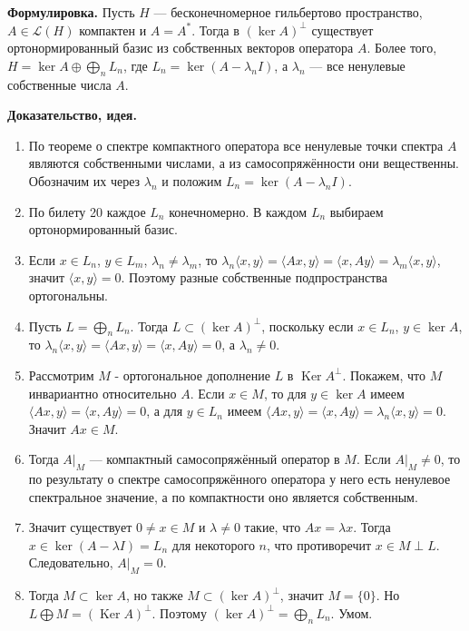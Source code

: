 \documentclass[10pt,a4paper]{article}
\newcommand{\Ker}{\operatorname{Ker}}
\begin{document}
	\textbf{Формулировка.} Пусть $H$ --- бесконечномерное гильбертово пространство, $A\in\mathcal L(H)$ компактен и $A=A^*$. Тогда в $(\ker A)^\perp$ существует ортонормированный базис из собственных векторов оператора $A$. Более того, $H=\ker A\oplus{\bigoplus_n L_n}$, где $L_n=\ker(A-\lambda_n I)$, а $\lambda_n$ --- все ненулевые собственные числа $A$.

	\textbf{Доказательство, идея.}
	\begin{enumerate}
		\item По теореме о спектре компактного оператора все ненулевые точки спектра $A$ являются собственными числами, а из самосопряжённости они вещественны. Обозначим их через $\lambda_n$ и положим $L_n=\ker(A-\lambda_n I)$.

		\item По билету 20 каждое $L_n$ конечномерно. В каждом $L_n$ выбираем ортонормированный базис.

		\item Если $x\in L_n$, $y\in L_m$, $\lambda_n\ne\lambda_m$, то $\lambda_n\langle x,y\rangle=\langle Ax,y\rangle=\langle x,Ay\rangle=\lambda_m\langle x,y\rangle$, значит $\langle x,y\rangle=0$. Поэтому разные собственные подпространства ортогональны.

		\item Пусть $L={\bigoplus_n L_n}$. Тогда $L\subset(\ker A)^\perp$, поскольку если $x\in L_n$, $y\in\ker A$, то $\lambda_n\langle x,y\rangle=\langle Ax,y\rangle=\langle x,Ay\rangle=0$, а $\lambda_n\ne0$.

		\item Рассмотрим $M$ - ортогональное дополнение $L$ в $\Ker A^\perp$. Покажем, что $M$ инвариантно относительно $A$. Если $x\in M$, то для $y\in\ker A$ имеем $\langle Ax,y\rangle=\langle x,Ay\rangle=0$, а для $y\in L_n$ имеем $\langle Ax,y\rangle=\langle x,Ay\rangle=\lambda_n\langle x,y\rangle=0$. Значит $Ax\in M$.

		\item Тогда $A|_M$ --- компактный самосопряжённый оператор в $M$. Если $A|_M\ne0$, то по результату о спектре самосопряжённого оператора у него есть ненулевое спектральное значение, а по компактности оно является собственным.

		\item Значит существует $0\ne x\in M$ и $\lambda\ne0$ такие, что $Ax=\lambda x$. Тогда $x\in\ker(A-\lambda I)=L_n$ для некоторого $n$, что противоречит $x\in M\perp L$. Следовательно, $A|_M=0$.
		\item Тогда $M\subset\ker A$, но также $M\subset(\ker A)^\perp$, значит $M=\{0\}$. Но $L \bigoplus M = (\Ker A)^\perp$.
		Поэтому $(\ker A)^\perp={\bigoplus_n L_n}$. Умом.
	\end{enumerate}
\end{document}
